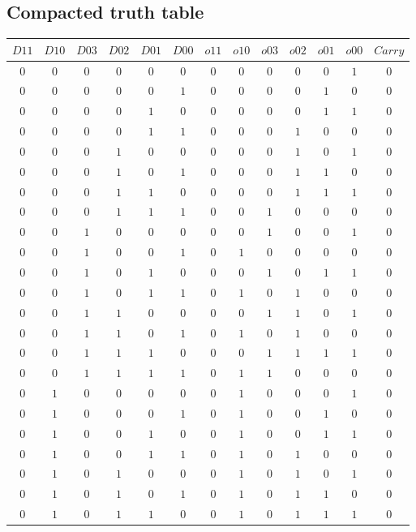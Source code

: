 \documentclass [15pt,a4paper,twoside]{article}
\begin{document}
\subsection{Compacted truth table}
\begin{center}
\begin{tabular}{cccccc|ccccccc}
$D11$&$D10$&$D03$&$D02$&$D01$&$D00$&$o11$&$o10$&$o03$&$o02$&$o01$&$o00$&$Carry$\\
\hline
$0$&$0$&$0$&$0$&$0$&$0$&$0$&$0$&$0$&$0$&$0$&$1$&$0$\\
$0$&$0$&$0$&$0$&$0$&$1$&$0$&$0$&$0$&$0$&$1$&$0$&$0$\\
$0$&$0$&$0$&$0$&$1$&$0$&$0$&$0$&$0$&$0$&$1$&$1$&$0$\\
$0$&$0$&$0$&$0$&$1$&$1$&$0$&$0$&$0$&$1$&$0$&$0$&$0$\\
$0$&$0$&$0$&$1$&$0$&$0$&$0$&$0$&$0$&$1$&$0$&$1$&$0$\\
$0$&$0$&$0$&$1$&$0$&$1$&$0$&$0$&$0$&$1$&$1$&$0$&$0$\\
$0$&$0$&$0$&$1$&$1$&$0$&$0$&$0$&$0$&$1$&$1$&$1$&$0$\\
$0$&$0$&$0$&$1$&$1$&$1$&$0$&$0$&$1$&$0$&$0$&$0$&$0$\\
$0$&$0$&$1$&$0$&$0$&$0$&$0$&$0$&$1$&$0$&$0$&$1$&$0$\\
$0$&$0$&$1$&$0$&$0$&$1$&$0$&$1$&$0$&$0$&$0$&$0$&$0$\\
$0$&$0$&$1$&$0$&$1$&$0$&$0$&$0$&$1$&$0$&$1$&$1$&$0$\\
$0$&$0$&$1$&$0$&$1$&$1$&$0$&$1$&$0$&$1$&$0$&$0$&$0$\\
$0$&$0$&$1$&$1$&$0$&$0$&$0$&$0$&$1$&$1$&$0$&$1$&$0$\\
$0$&$0$&$1$&$1$&$0$&$1$&$0$&$1$&$0$&$1$&$0$&$0$&$0$\\
$0$&$0$&$1$&$1$&$1$&$0$&$0$&$0$&$1$&$1$&$1$&$1$&$0$\\
$0$&$0$&$1$&$1$&$1$&$1$&$0$&$1$&$1$&$0$&$0$&$0$&$0$\\
$0$&$1$&$0$&$0$&$0$&$0$&$0$&$1$&$0$&$0$&$0$&$1$&$0$\\
$0$&$1$&$0$&$0$&$0$&$1$&$0$&$1$&$0$&$0$&$1$&$0$&$0$\\
$0$&$1$&$0$&$0$&$1$&$0$&$0$&$1$&$0$&$0$&$1$&$1$&$0$\\
$0$&$1$&$0$&$0$&$1$&$1$&$0$&$1$&$0$&$1$&$0$&$0$&$0$\\
$0$&$1$&$0$&$1$&$0$&$0$&$0$&$1$&$0$&$1$&$0$&$1$&$0$\\
$0$&$1$&$0$&$1$&$0$&$1$&$0$&$1$&$0$&$1$&$1$&$0$&$0$\\
$0$&$1$&$0$&$1$&$1$&$0$&$0$&$1$&$0$&$1$&$1$&$1$&$0$\\

\end{tabular}
\end{center}
\end{document}
